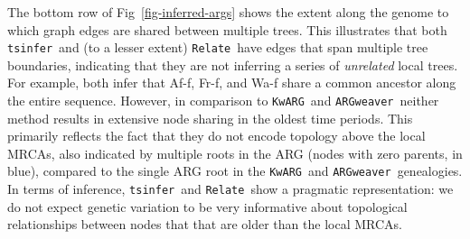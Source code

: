 \documentclass{article}
\newcommand{\noderef}[1]{\textsf{#1}}
\newcommand{\tsinfer}[0]{\texttt{tsinfer}}
\newcommand{\kwarg}[0]{\texttt{KwARG}}
\newcommand{\argweaver}[0]{\texttt{ARGweaver}}
\newcommand{\relate}[0]{\texttt{Relate}}
\begin{document}

The bottom row of Fig~\ref{fig-inferred-args} shows the extent along
the genome to which graph edges are shared between multiple trees.
This illustrates that both \tsinfer\ and (to a lesser extent) \relate\ have edges
that span multiple tree boundaries, indicating that they are not inferring
a series of \emph{unrelated} local trees.
For example, both infer that \noderef{Af-f}, \noderef{Fr-f}, and \noderef{Wa-f}
share a common ancestor along
the entire sequence. However, in comparison to \kwarg\ and \argweaver\ neither
method results in extensive node sharing in the
oldest time periods. This primarily reflects the fact that they do not encode topology
above the local MRCAs, also indicated by multiple roots in the ARG
(nodes with zero parents, in blue), compared to the
single ARG root in the \kwarg\ and \argweaver\ genealogies. In terms of inference,
\tsinfer\ and \relate\ show a pragmatic representation: we do not expect
genetic variation to be very informative about topological relationships
between nodes that that are older than the local MRCAs.
\end{document}
